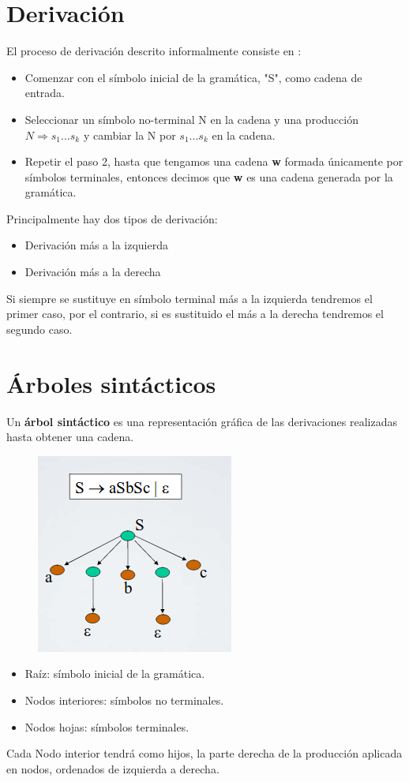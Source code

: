 \section{Derivación}
El proceso de derivación descrito informalmente consiste en :
\begin{itemize}
	\item Comenzar con el símbolo inicial de la gramática, "S", como cadena de entrada.
	\item Seleccionar un símbolo no-terminal N en la cadena y una producción $N\Rightarrow s_1...s_k$ y cambiar la N por $s_1...s_k$ en la cadena.
	\item Repetir el paso 2, hasta que tengamos una cadena \textbf{w} formada únicamente por símbolos terminales, entonces decimos que \textbf{w} es una cadena generada por la gramática.
\end{itemize}
Principalmente hay dos tipos de derivación:
\begin{itemize}
	\item Derivación más a la izquierda
	\item Derivación más a la derecha
\end{itemize}
Si siempre se sustituye en símbolo terminal más a la izquierda tendremos el primer caso, por el contrario, si es sustituido el más a la derecha tendremos el segundo caso.
\section{Árboles sintácticos}
Un \textbf{árbol sintáctico} es una representación gráfica de las derivaciones realizadas hasta obtener una cadena.
\begin{figure}[h]
	\centering
	\includegraphics[width=0.5\linewidth]{img/treee}
	\caption{}
	\label{fig:treee}
\end{figure}
\begin{itemize}
	\item Raíz: símbolo inicial de la gramática.
	\item Nodos interiores: símbolos no terminales.
	\item Nodos hojas: símbolos terminales.
\end{itemize}
Cada Nodo interior tendrá como hijos, la parte derecha de la producción aplicada en nodos, ordenados de izquierda a derecha.
